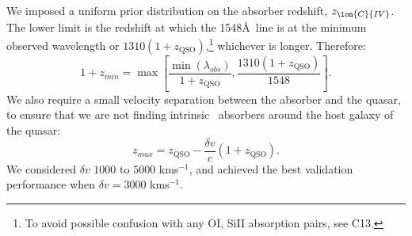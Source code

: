 \documentclass[fleqn,usenatbib]{mnras}
\newcommand{\civ}{\ion{C}{IV}}
\newcommand{\zciv}{z_{\civ}}
\newcommand{\kms}{kms$^{-1}$} %
\newcommand{\zqso}{z_{\textrm{QSO}}}
\begin{document}
We imposed a uniform prior distribution on the absorber redshift, $\zciv$. The lower limit is the redshift at which the 1548\AA\ line is at the minimum observed wavelength
or $1310(1+\zqso)$,\footnote{To avoid possible confusion with any OI, SiII absorption pairs, see C13.} whichever is longer. Therefore:
\begin{equation}
  1+ z_{min} = \max\left[\frac{\min(\lambda_{obs})}{1+\zqso}, \frac{1310(1+\zqso)}{1548}\right].
  \label{eq:zmin}
\end{equation}
We also require a small velocity separation between the absorber and the quasar, to ensure that we are not finding intrinsic \civ\ absorbers around the host galaxy of the quasar:
\begin{equation}
  z_{max} = \zqso - \frac{\delta v}{c}(1+\zqso).
  \label{eq:zmax}
\end{equation}
We considered $\delta v$ $1000$ to $5000$ \kms, and achieved the best validation performance when $\delta v =3000$ \kms.
\end{document}
